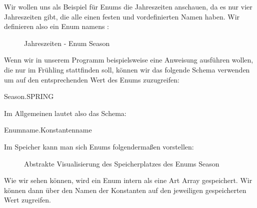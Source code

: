 \documentclass{tuda-pub}
\begin{document}
  \br

  Wir wollen uns als Beispiel für Enums die Jahreszeiten anschauen, da es nur vier Jahreszeiten
  gibt, die alle einen festen und vordefinierten Namen haben. Wir definieren also ein Enum namens
  :

  \begin{figure}[h]
    \centering
    
    \caption{Jahreszeiten - Enum Season}
  \end{figure}

  Wenn wir in unserem Programm beispielsweise eine Anweisung ausführen wollen, die nur im
  Frühling stattfinden soll, können wir das folgende Schema verwenden um auf den entsprechenden
  Wert des Enums zuzugreifen:

  \begin{center}
    Season.SPRING
  \end{center}

  Im Allgemeinen lautet also das Schema:

  \begin{center}
    Enumname.Konstantenname
  \end{center}

  Im Speicher kann man sich Enums folgendermaßen vorstellen:

  \begin{figure}[h]
    \centering
    \begin{memory}
    \end{memory}
    \caption{Abstrakte Visualisierung des Speicherplatzes des Enums Season}
  \end{figure}

  Wie wir sehen können, wird ein Enum intern als eine Art Array gespeichert. Wir können dann über
  den Namen der Konstanten auf den jeweiligen gespeicherten Wert zugreifen.

  \printindex
\end{document}
